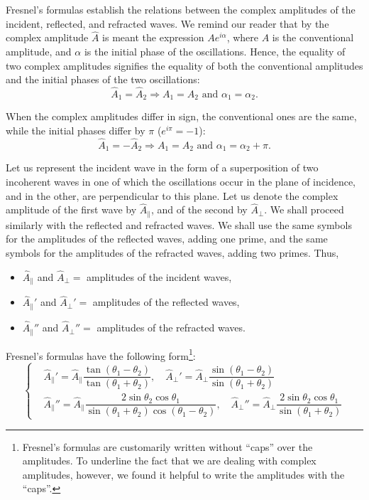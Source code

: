 Fresnel's formulas establish the relations between the complex amplitudes of the incident, reflected, and refracted waves.
We remind our reader that by the complex amplitude $\hat{A}$ is meant the expression $Ae^{i\alpha}$, where $A$ is the conventional amplitude, and $\alpha$ is the initial phase of the oscillations.
Hence, the equality of two complex amplitudes signifies the equality of both the conventional amplitudes and the initial phases of the two oscillations:
\begin{equation}\label{eq:19_7}
	\hat{A}_1 = \hat{A}_2 \Rightarrow A_1=A_2 \text{ and } \alpha_1=\alpha_2.
\end{equation}

\noindent
When the complex amplitudes differ in sign, the conventional ones are the same, while the initial phases differ by $\pi$ ($e^{i\pi}=-1$):
\begin{equation}\label{eq:19_8}
	\hat{A}_1 = -\hat{A}_2 \Rightarrow A_1=A_2 \text{ and } \alpha_1=\alpha_2+\pi.
\end{equation}

Let us represent the incident wave in the form of a superposition of two incoherent waves in one of which the oscillations occur in the plane of incidence, and in the other, are perpendicular to this plane.
Let us denote the complex amplitude of the first wave by $\hat{A}_{\parallel}$, and of the second by $\hat{A}_{\perp}$.
We shall proceed similarly with the reflected and refracted waves.
We shall use the same symbols for the amplitudes of the reflected waves, adding one prime, and the
same symbols for the amplitudes of the refracted waves, adding two primes.
Thus,
\begin{itemize}[]
	\item $\hat{A}_{\parallel}$ and $\hat{A}_{\perp} = $ amplitudes of the incident waves,
	\item $\hat{A}_{\parallel}'$ and $\hat{A}_{\perp}' = $ amplitudes of the reflected waves,
	\item $\hat{A}_{\parallel}''$ and $\hat{A}_{\perp}'' = $ amplitudes of the refracted waves.
\end{itemize}

Fresnel's formulas have the following form\footnote{Fresnel's formulas are customarily written without ``caps'' over the amplitudes. To underline the fact that we are dealing with complex amplitudes, however, we found it helpful to write the amplitudes with the ``caps''.}:
\begin{equation}\label{eq:19_9}
	\begin{cases}
		&\!\!\! \hat{A}_{\parallel}' = \hat{A}_{\parallel} \dfrac{\tan(\theta_1-\theta_2)}{\tan(\theta_1+\theta_2)},\quad
		\hat{A}_{\perp}' = \hat{A}_{\perp} \dfrac{\sin(\theta_1-\theta_2)}{\sin(\theta_1+\theta_2)}\\[8pt]
		&\!\!\! \hat{A}_{\parallel}'' = \hat{A}_{\parallel} \dfrac{2\sin\theta_2\cos\theta_1}{\sin(\theta_1+\theta_2)\cos(\theta_1-\theta_2)},\quad \hat{A}_{\perp}'' = \hat{A}_{\perp} \dfrac{2\sin\theta_2\cos\theta_1}{\sin(\theta_1+\theta_2)}
	\end{cases}
\end{equation}


